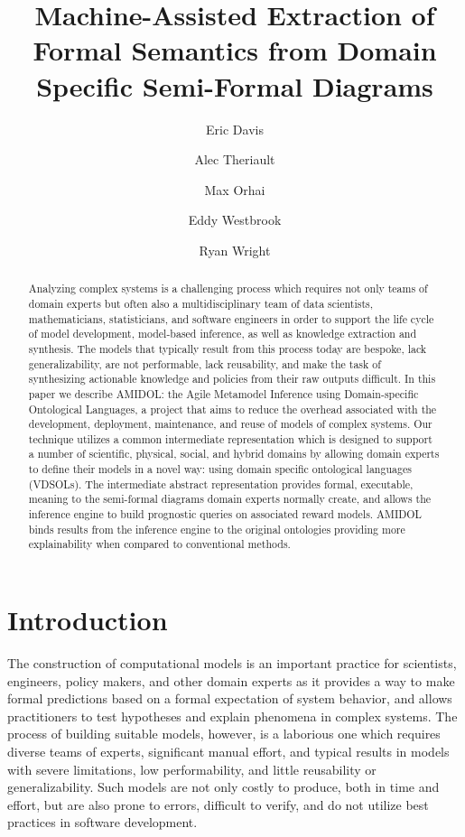 \documentclass[11pt]{article}
\date{\vspace{-5ex}}
\author[1]{Eric Davis}
\author[1]{Alec Theriault}
\author[1]{Max Orhai}
\author[1]{Eddy Westbrook}
\author[1]{Ryan Wright}
\affil[1]{Galois, Inc}
\title{Machine-Assisted Extraction of Formal Semantics from Domain Specific Semi-Formal Diagrams}
\newcommand{\amidol}{\textsc{AMIDOL}}
\begin{document}
\maketitle
\vspace{10pt}
\begin{abstract}
Analyzing complex systems is a challenging process which requires not only teams of domain experts but often also a multidisciplinary team of data scientists, mathematicians, statisticians, and software engineers in order to support the life cycle of model development, model-based inference, as well as knowledge extraction and synthesis.  The models that typically result from this process today are bespoke, lack generalizability, are not performable, lack reusability, and make the task of synthesizing actionable knowledge and policies from their raw outputs difficult.  In this paper we describe \amidol{}: the Agile Metamodel Inference using Domain-specific Ontological Languages, a project that aims to reduce the overhead associated with the development, deployment, maintenance, and reuse of models of complex systems.  Our technique utilizes a common intermediate representation which is designed to support a number of scientific, physical, social, and hybrid domains by allowing domain experts to define their models in a novel way: using domain specific ontological languages (VDSOLs).  The intermediate abstract representation provides formal, executable, meaning to the semi-formal diagrams domain experts normally create, and allows the inference engine to build prognostic queries on associated reward models.  \amidol{} binds results from the inference engine to the original ontologies providing more explainability when compared to conventional methods.
\end{abstract}

\section{Introduction}

The construction of computational models is an important practice for scientists, engineers, policy makers, and other domain experts as it provides a way to make formal predictions based on a formal expectation of system behavior, and allows practitioners to test hypotheses and explain phenomena in complex systems.  The process of building suitable models, however, is a laborious one which requires diverse teams of experts, significant manual effort, and typical results in models with severe limitations, low performability, and little reusability or generalizability.  Such models are not only costly to produce, both in time and effort, but are also prone to errors, difficult to verify, and do not utilize best practices in software development.
\end{document}
